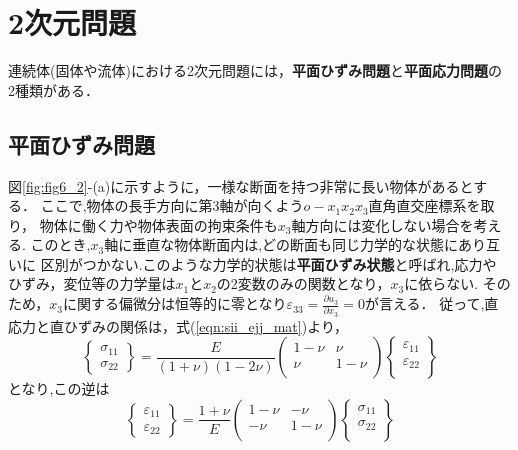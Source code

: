 \documentclass[10pt,a4j]{jbook}
\begin{document}
\section{2次元問題}
連続体(固体や流体)における2次元問題には，{\bf 平面ひずみ問題}と{\bf 平面応力問題}の
2種類がある．
\subsection{平面ひずみ問題}
図\ref{fig:fig6_2}-(a)に示すように，一様な断面を持つ非常に長い物体があるとする．
ここで,物体の長手方向に第3軸が向くよう$o-x_1x_2x_3$直角直交座標系を取り，
物体に働く力や物体表面の拘束条件も$x_3$軸方向には変化しない場合を考える.
このとき,$x_3$軸に垂直な物体断面内は,どの断面も同じ力学的な状態にあり互いに
区別がつかない.このような力学的状態は{\bf 平面ひずみ状態}と呼ばれ,応力や
ひずみ，変位等の力学量は$x_1$と$x_2$の2変数のみの関数となり，$x_3$に依らない.
そのため，$x_3$に関する偏微分は恒等的に零となり$\varepsilon_{33}=
\frac{\partial u_3}{\partial x_3}=0$が言える．
従って,直応力と直ひずみの関係は，式(\ref{eqn:sii_ejj_mat})より，
\begin{equation}
	\left\{ 
	\begin{array}{*{20}{c}}
		\sigma _{11}\\
		\sigma _{22}
	\end{array} 
	\right\} 
	= 
	\frac{E}{\left( 1 + \nu  \right)\left( 1 - 2\nu  \right)}
	\left( 
		\begin{array}{*{20}{c}}
		1 - \nu & \nu \\
		\nu & 1 - \nu \\
		\end{array}
	\right)
	\left\{ 
		\begin{array}{*{20}{c}}
		\varepsilon _{11}\\
		\varepsilon _{22}\\
		\end{array}
	\right\}
	\label{eqn:Hooke_pstrain}
\end{equation}
となり,この逆は
\begin{equation}
	\left\{ 
	\begin{array}{*{20}{c}}
		\varepsilon _{11}\\
		\varepsilon_{22}
	\end{array} 
	\right\} 
	= 
	\frac{1+\nu}{E}
	\left( 
		\begin{array}{*{20}{c}}
		1 - \nu & -\nu \\
		-\nu & 1 - \nu \\
		\end{array}
	\right)
	\left\{ 
		\begin{array}{*{20}{c}}
		\sigma_{11}\\
		\sigma_{22}\\
		\end{array}
	\right\}
	\label{eqn:Hooke_pstrain}
\end{equation}
\end{document}
